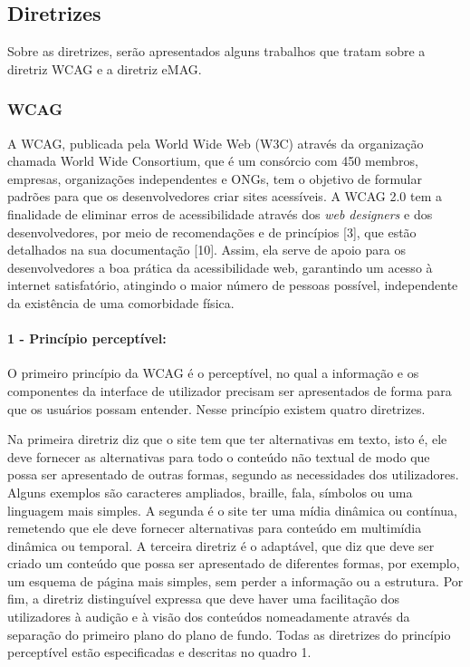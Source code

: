 \documentclass[a4paper]{article}
\begin{document}
\begin{titlepage}
\subsection{Diretrizes}
Sobre as diretrizes, serão apresentados alguns trabalhos que tratam sobre a diretriz WCAG e a diretriz eMAG.

\subsubsection{WCAG}

A WCAG, publicada pela World Wide Web (W3C) através da organização chamada World Wide Consortium, que é um consórcio com 450 membros, empresas, organizações independentes e ONGs, tem o objetivo de formular padrões para que os desenvolvedores criar sites acessíveis. A WCAG 2.0 tem a finalidade de eliminar erros de acessibilidade através dos \textit{web designers} e dos desenvolvedores, por meio de recomendações e de princípios [3], que estão detalhados na sua documentação [10]. Assim, ela serve de apoio para os desenvolvedores a boa prática da acessibilidade web, garantindo um acesso à internet satisfatório, atingindo o maior número de pessoas possível, independente da existência de uma comorbidade física.

\paragraph{1 - Princípio perceptível:}

O primeiro princípio da WCAG é o perceptível, no qual a informação e os componentes da interface de utilizador precisam ser apresentados de forma para que os usuários possam entender. Nesse princípio existem quatro diretrizes.

Na primeira diretriz diz que o site tem que ter alternativas em texto, isto é, ele deve fornecer as alternativas para todo o conteúdo não textual de modo que possa ser apresentado de outras formas, segundo as necessidades dos utilizadores. Alguns exemplos são caracteres ampliados, braille, fala, símbolos ou uma linguagem mais simples. A segunda é o site ter uma mídia dinâmica ou contínua, remetendo que ele deve fornecer alternativas para conteúdo em multimídia dinâmica ou temporal. A terceira diretriz é o adaptável, que diz que deve ser criado um conteúdo que possa ser apresentado de diferentes formas, por exemplo, um esquema de página mais simples, sem perder a informação ou a estrutura. Por fim, a diretriz distinguível expressa que deve haver uma facilitação dos utilizadores à audição e à visão dos conteúdos nomeadamente através da separação do primeiro plano do plano de fundo. Todas as diretrizes do princípio perceptível estão especificadas e descritas no quadro 1.\\


\end{titlepage}
\end{document}
